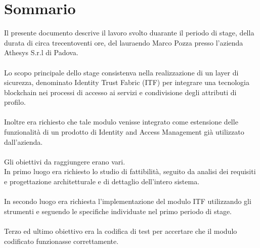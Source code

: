 
\cleardoublepage
{}
{}
\begingroup
\let\clearpage\relax
\let\cleardoublepage\relax
\let\cleardoublepage\relax

\chapter*{Sommario}

Il presente documento descrive il lavoro svolto duarante il periodo di stage, della durata di circa trecentoventi ore, del lauraendo Marco Pozza presso l'azienda Athesys S.r.l di Padova.\\\\
Lo scopo principale dello stage consistenva nella realizzazione di un layer di sicurezza, denominato Identity Trust Fabric (ITF) per integrare una tecnologia blockchain nei processi di accesso ai servizi e condivisione degli attributi di profilo.\\\\
Inoltre era richiesto che tale modulo venisse integrato come estensione delle funzionalità di un prodotto di Identity and Access Management già utilizzato dall'azienda.\\\\
Gli obiettivi da raggiungere erano vari.\\
In primo luogo era richiesto lo studio di fattibilità, seguito da analisi dei requisiti e progettazione architetturale e di dettaglio dell'intero sistema.\\\\
In secondo luogo era richiesta l'implementazione del modulo ITF utilizzando gli strumenti e seguendo le specifiche individuate nel primo periodo di stage.\\\\
Terzo ed ultimo obiettivo era la codifica di test per accertare che il modulo codificato funzionasse correttamente.

%
%

\endgroup			

\vfill

